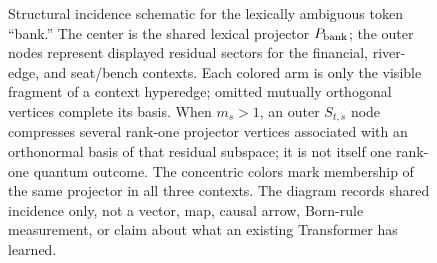 \documentclass[
  aps,
  reprint,
  superscriptaddress,
  floatfix,
  nofootinbib,
  longbibliography
]{revtex4-2}
\begin{document}
\begin{figure}[t]
\centering
{}
\caption{%
Structural incidence schematic for the lexically ambiguous token ``bank.''
The center is the shared lexical projector $P_{\rm bank}$; the outer nodes
represent displayed residual sectors for the financial, river-edge, and
seat/bench contexts.  Each colored arm is only the visible fragment of a
context hyperedge; omitted mutually orthogonal vertices complete its basis.
When $m_s>1$, an outer $S_{t,s}$ node compresses several rank-one projector
vertices associated with an orthonormal basis of that residual subspace; it is
not itself one rank-one quantum outcome.
The concentric colors mark membership of the same projector in all three
contexts.  The diagram records shared incidence only, not a vector, map,
causal arrow, Born-rule measurement, or claim about what an existing
Transformer has learned.
}
\label{fig:reference-subspace}
\end{figure}
\end{document}
